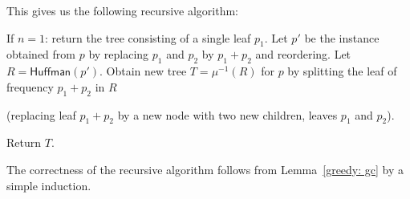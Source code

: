 This gives us the following recursive algorithm:

\newcommand{\Huffman}{\textsf{Huffman}\xspace}

\begin{myframed}
  \begin{steps}
  \item[$\Huffman\big(p=(p_1,p_2,\ldots,p_n)\big)$:]
    \step If $n = 1$: return the tree consisting of a single leaf $p_1$.
    \step Let $p'$ be the instance obtained from $p$ by replacing $p_1$ and $p_2$ by $p_1+p_2$ and reordering.
    \step Let $R = \Huffman(p')$.
    \step Obtain new tree $T=\mu^{-1}(R)$ for $p$
    by splitting the leaf of frequency $p_1+p_2$ in $R$

    (replacing leaf $p_1+p_2$ by a new node with two new children, leaves $p_1$ and $p_2$).

    \step Return $T$.
  \end{steps}
\end{myframed}

The correctness of the recursive algorithm follows from Lemma~\ref{greedy: gc} by a simple induction.

